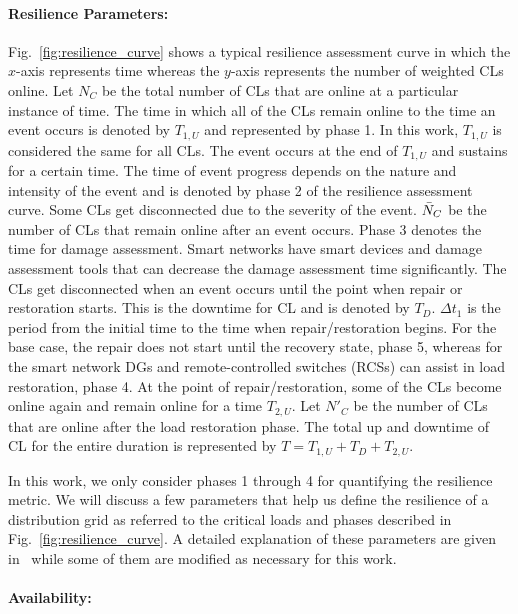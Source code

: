 \paragraph{Resilience Parameters:}\label{par:resilience_parameter}

Fig.~\ref{fig:resilience_curve} shows a typical resilience assessment curve in which the $x$-axis represents time whereas the $y$-axis represents the number of weighted CLs online. Let $N_C$ be the total number of CLs that are online at a particular instance of time. The time in which all of the CLs remain online to the time an event occurs is denoted by $T_{1,U}$ and represented by phase 1. In this work, $T_{1,U}$ is considered the same for all CLs. The event occurs at the end of $T_{1,U}$ and sustains for a certain time. The time of event progress depends on the nature and intensity of the event and is denoted by phase 2 of the resilience assessment curve. Some CLs get disconnected due to the severity of the event. $\Bar{N}_C$ be the number of CLs that remain online after an event occurs. Phase 3 denotes the time for damage assessment. Smart networks have smart devices and damage assessment tools that can decrease the damage assessment time significantly. The CLs get disconnected when an event occurs until the point when repair or restoration starts. This is the downtime for CL and is denoted by $T_D$. $\Delta t_1$ is the period from the initial time to the time when repair/restoration begins. For the base case, the repair does not start until the recovery state, phase 5, whereas for the smart network DGs and remote-controlled switches (RCSs) can assist in load restoration, phase 4. At the point of repair/restoration, some of the CLs become online again and remain online for a time $T_{2,U}$. Let $N'_C$ be the number of CLs that are online after the load restoration phase. The total up and downtime of CL for the entire duration is represented by $T=T_{1, U} + T_D + T_{2,U}$. 

In this work, we only consider phases 1 through 4 for quantifying the resilience metric. We will discuss a few parameters that help us define the resilience of a distribution grid as referred to the critical loads and phases described in Fig.~\ref{fig:resilience_curve}. A detailed explanation of these parameters are given in~\cite{2016} while some of them are modified as necessary for this work.

\paragraph*{Availability:}


